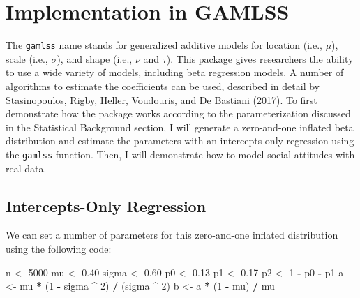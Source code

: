 \documentclass[english,man]{apa6}
\newenvironment{Shaded}{\begin{snugshade}}{\end{snugshade}}
\newcommand{\DecValTok}[1]{\textcolor[rgb]{0.00,0.00,0.81}{#1}}
\newcommand{\FloatTok}[1]{\textcolor[rgb]{0.00,0.00,0.81}{#1}}
\newcommand{\StringTok}[1]{\textcolor[rgb]{0.31,0.60,0.02}{#1}}
\newcommand{\OperatorTok}[1]{\textcolor[rgb]{0.81,0.36,0.00}{\textbf{#1}}}
\newcommand{\NormalTok}[1]{#1}
\theoremstyle{definition}
\theoremstyle{definition}
\theoremstyle{remark}
\begin{document}
\section{Implementation in GAMLSS}\label{implementation-in-gamlss}

The \texttt{gamlss} name stands for generalized additive models for
location (i.e., \(\mu\)), scale (i.e., \(\sigma\)), and shape (i.e.,
\(\nu\) and \(\tau\)). This package gives researchers the ability to use
a wide variety of models, including beta regression models. A number of
algorithms to estimate the coefficients can be used, described in detail
by Stasinopoulos, Rigby, Heller, Voudouris, and De Bastiani (2017). To
first demonstrate how the package works according to the
parameterization discussed in the Statistical Background section, I will
generate a zero-and-one inflated beta distribution and estimate the
parameters with an intercepts-only regression using the \texttt{gamlss}
function. Then, I will demonstrate how to model social attitudes with
real data.

\subsection{Intercepts-Only
Regression}\label{intercepts-only-regression}

We can set a number of parameters for this zero-and-one inflated
distribution using the following code:

\begin{Shaded}
\begin{Highlighting}[]
\NormalTok{n <-}\StringTok{ }\DecValTok{5000}
\NormalTok{mu <-}\StringTok{ }\FloatTok{0.40}
\NormalTok{sigma <-}\StringTok{ }\FloatTok{0.60}
\NormalTok{p0 <-}\StringTok{ }\FloatTok{0.13}
\NormalTok{p1 <-}\StringTok{ }\FloatTok{0.17}
\NormalTok{p2 <-}\StringTok{ }\DecValTok{1} \OperatorTok{-}\StringTok{ }\NormalTok{p0 }\OperatorTok{-}\StringTok{ }\NormalTok{p1}
\NormalTok{a <-}\StringTok{ }\NormalTok{mu }\OperatorTok{*}\StringTok{ }\NormalTok{(}\DecValTok{1} \OperatorTok{-}\StringTok{ }\NormalTok{sigma }\OperatorTok{^}\StringTok{ }\DecValTok{2}\NormalTok{) }\OperatorTok{/}\StringTok{ }\NormalTok{(sigma }\OperatorTok{^}\StringTok{ }\DecValTok{2}\NormalTok{)}
\NormalTok{b <-}\StringTok{ }\NormalTok{a }\OperatorTok{*}\StringTok{ }\NormalTok{(}\DecValTok{1} \OperatorTok{-}\StringTok{ }\NormalTok{mu) }\OperatorTok{/}\StringTok{ }\NormalTok{mu}
\end{Highlighting}
\end{Shaded}
\end{document}
